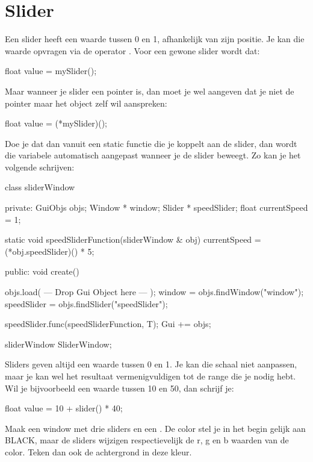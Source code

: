 \chapter{Slider}

Een slider heeft een waarde tussen 0 en 1, afhankelijk van zijn positie. Je kan die waarde opvragen via de operator \eeFunc{()}. Voor een gewone slider wordt dat:

\begin{code}
float value = mySlider();
\end{code}

Maar wanneer je slider een pointer is, dan moet je wel aangeven dat je niet de pointer maar het object zelf wil aanspreken:

\begin{code}
float value = (*mySlider)();
\end{code}

Doe je dat dan vanuit een static functie die je koppelt aan de slider, dan wordt die variabele automatisch aangepast wanneer je de slider beweegt. Zo kan je het volgende schrijven:

\begin{code}
class sliderWindow
{
private:
   GuiObjs objs;
	 Window * window;
	 Slider * speedSlider;   
	 float currentSpeed = 1;	
	
   static void speedSliderFunction(sliderWindow & obj) {
		  currentSpeed = (*obj.speedSlider)() * 5;
	 }
	
public:
   void create()
   {
      objs.load( --- Drop Gui Object here --- );
      window = objs.findWindow("window");
			speedSlider = objs.findSlider("speedSlider");

			speedSlider.func(speedSliderFunction, T);
      Gui += objs;
   }
}
sliderWindow SliderWindow;
\end{code}

\begin{note}
Sliders geven altijd een waarde tussen 0 en 1. Je kan die schaal niet aanpassen, maar je kan wel het resultaat vermenigvuldigen tot de range die je nodig hebt. Wil je bijvoorbeeld een waarde tussen 10 en 50, dan schrijf je:

\begin{code}
float value = 10 + slider() * 40;
\end{code}
\end{note} 

\begin{exercise}
Maak een window met drie sliders en een . De color stel je in het begin gelijk aan BLACK, maar de sliders wijzigen respectievelijk de r, g en b waarden van de color. Teken dan ook de achtergrond in deze kleur.
\end{exercise}